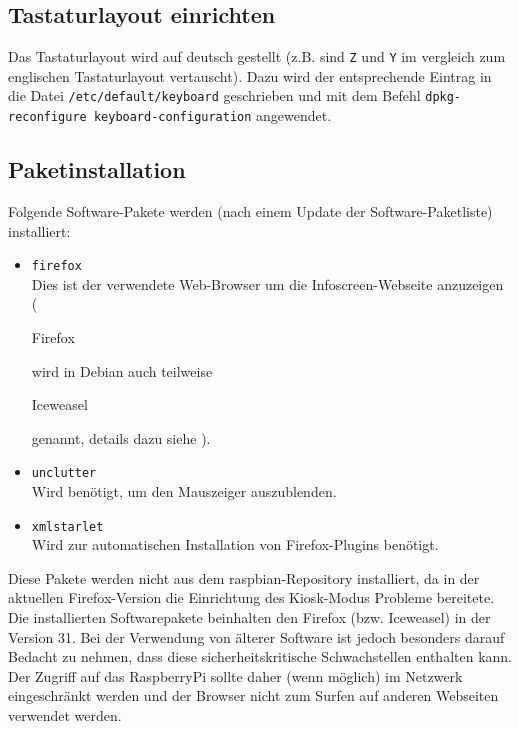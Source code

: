 \subsection{Tastaturlayout einrichten}
\label{sec:tastatur}
Das Tastaturlayout wird auf deutsch gestellt (z.B. sind \lstinline|Z| und \lstinline|Y| im vergleich zum englischen Tastaturlayout vertauscht).
Dazu wird der entsprechende Eintrag in die Datei \lstinline|/etc/default/keyboard| geschrieben und mit dem Befehl \lstinline|dpkg-reconfigure keyboard-configuration| angewendet.

\subsection{Paketinstallation}
\label{sec:paketinstallation}
Folgende Software-Pakete werden (nach einem Update der Software-Paketliste) installiert:
\begin{itemize}
	\item {\lstinline|firefox|\\Dies ist der verwendete Web-Browser um die Infoscreen-Webseite anzuzeigen (\begin{em}Firefox\end{em} wird in Debian auch teilweise \begin{em}Iceweasel\end{em} genannt, details dazu siehe \cite{iceweasel}).}
	\item {\lstinline|unclutter|\\Wird benötigt, um den Mauszeiger auszublenden.}
	\item {\lstinline|xmlstarlet|\\Wird zur automatischen Installation von Firefox-Plugins benötigt.}
\end{itemize}

Diese Pakete werden nicht aus dem raspbian-Repository installiert, da in der aktuellen Firefox-Version die Einrichtung des Kiosk-Modus Probleme bereitete.
Die installierten Softwarepakete beinhalten den Firefox (bzw. Iceweasel) in der Version 31. 
Bei der Verwendung von älterer Software ist jedoch besonders darauf Bedacht zu nehmen, dass diese sicherheitskritische Schwachstellen enthalten kann.
Der Zugriff auf das RaspberryPi sollte daher (wenn möglich) im Netzwerk eingeschränkt werden und der Browser nicht zum Surfen auf anderen Webseiten verwendet werden.

